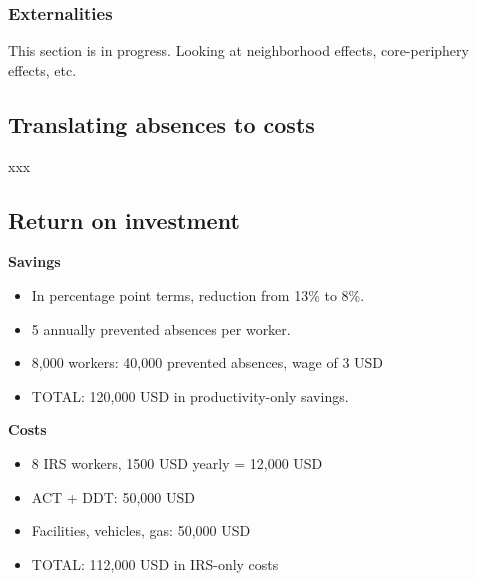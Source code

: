 \documentclass[]{article}
\providecommand{\tightlist}{%
  \setlength{\itemsep}{0pt}\setlength{\parskip}{0pt}}
\begin{document}
\subsubsection{Externalities}\label{externalities}

This section is in progress. Looking at neighborhood effects,
core-periphery effects, etc.

\subsection{Translating absences to
costs}\label{translating-absences-to-costs}

xxx

\subsection{Return on investment}\label{return-on-investment}


\textbf{Savings}

\begin{itemize}
\tightlist
\item
  In percentage point terms, reduction from 13\% to 8\%.\\
\item
  5 annually prevented absences per worker.\\
\item
  8,000 workers: 40,000 prevented absences, wage of 3 USD
\item
  TOTAL: 120,000 USD in productivity-only savings.
\end{itemize}

\textbf{Costs}

\begin{itemize}
\tightlist
\item
  8 IRS workers, 1500 USD yearly = 12,000 USD\\
\item
  ACT + DDT: 50,000 USD
\item
  Facilities, vehicles, gas: 50,000 USD\\
\item
  TOTAL: 112,000 USD in IRS-only costs
\end{itemize}
\end{document}
